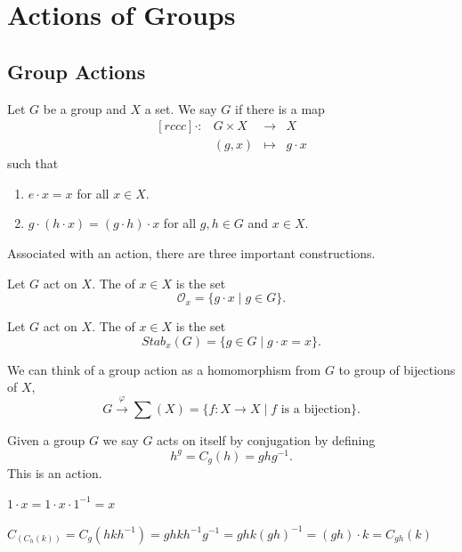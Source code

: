 \chapter{Actions of Groups}

\section{Group Actions}

\begin{definition}[Action]\label{def:action}
    Let $G$ be a group and $X$ a set. We say $G$  if there is a map \[
        \begin{matrix}[rccc]
            \cdot: & G \times X & \to     & X \\
                   & (g, x)     & \mapsto & g \cdot x
        \end{matrix}
    \] such that \begin{enumerate}
        \item $e \cdot x = x$ for all $x \in X$.
        \item $g \cdot (h \cdot x) = (g \cdot h) \cdot x$ for all $g, h \in G$ and $x \in X$.
    \end{enumerate}
\end{definition}

Associated with an action, there are three important constructions.

\begin{definition}[Orbit]\label{def:orbit}
    Let $G$ act on $X$. The  of $x \in X$ is the set \[
        \mathcal{O}_x = \{ g \cdot x \mid g \in G \}.
    \]
\end{definition}

\begin{definition}[Stabilizer]\label{def:stabilizer}
    Let $G$ act on $X$. The  of $x \in X$ is the set \[
        Stab_x(G) = \{ g \in G \mid g \cdot x = x \}.
    \]
\end{definition}

We can think of a group action as a homomorphism from $G$ to group of bijections of $X$, \[
    G \xrightarrow{\varphi} \sum (X) = \{ f: X \to X \mid f \text{ is a bijection} \}.
\]

\begin{example}
    Given a group $G$ we say $G$ acts on itself by conjugation by defining \[
        h^g = C_g(h) = g h g^{-1}.
    \] This is an action. 
    \begin{listu}
        \item $1 \cdot x = 1 \cdot x \cdot 1^{-1} = x$
        \item $C_(C_h(k)) = C_g(hkh^{-1}) = ghkh^{-1}g^{-1} = ghk(gh)^{-1} = (gh) \cdot k = C_{gh}(k)$
    \end{listu}
\end{example}

